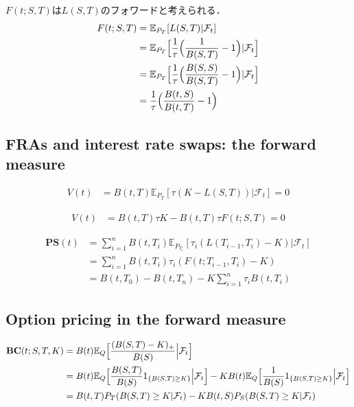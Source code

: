 \documentclass[11pt, a4paper]{jsarticle}
\newcommand{\E}{\mathbb{E}}
\newcommand{\PS}{\textbf{PS}}
\newcommand{\BC}{\textbf{BC}}
\begin{document}
$F(t; S, T)$は$L(S, T)$のフォワードと考えられる．
\begin{align}
F(t; S, T)
& =
\E_{P_T} [ L(S, T) | \mathcal{F}_t ] \nonumber \\
& =
\E_{P_T} \Bigl[ \frac{1}{\tau} \Bigl( \frac{1}{B(S, T)} - 1 \Bigr) | \mathcal{F}_t \Bigr] \nonumber \\
& =
\E_{P_T} \Bigl[ \frac{1}{\tau} \Bigl( \frac{B(S, S)}{B(S, T)} - 1 \Bigr) | \mathcal{F}_t \Bigr] \nonumber \\
& =
\frac{1}{\tau} \Bigl( \frac{B(t, S)}{B(t, T)} - 1 \Bigr) \nonumber
\end{align}

\subsection{FRAs and interest rate swaps: the forward measure}
\begin{align}
V(t)
& =
B(t, T) \E_{P_T} [ \tau (K - L(S, T)) | \mathcal{F}_t ] = 0 \nonumber
\end{align}

\begin{align}
V(t)
& =
B(t, T) \tau K - B(t, T) \tau F(t; S, T) = 0 \nonumber
\end{align}

\begin{align}
\PS(t)
& =
\sum_{i=1}^n B(t, T_i) \E_{P_{T_i}} [ \tau_i (L(T_{i-1}, T_i) - K) | \mathcal{F}_t ] \nonumber \\
& =
\sum_{i=1}^n B(t, T_i) \tau_i (F(t; T_{i-1}, T_i) - K) \nonumber \\
& =
B(t, T_0) - B(t, T_n) - K \sum_{i=1}^n \tau_i B(t, T_i) \nonumber
\end{align}

\subsection{Option pricing in the forward measure}
\begin{align}
\BC(t; S, T, K)
& =
B(t) \E_Q \Bigl[ \frac{(B(S, T) - K)_+}{B(S)} \Bigl| \mathcal{F}_t \Bigr] \nonumber \\
& =
B(t) \E_Q \Bigl[ \frac{B(S, T)}{B(S)} 1_{\{ B(S, T) \geq K \}} \Bigl| \mathcal{F}_t \Bigr]
- K B(t) \E_Q \Bigl[ \frac{1}{B(S)} 1_{\{ B(S, T) \geq K \}} \Bigl| \mathcal{F}_t \Bigr] \nonumber \\
& =
B(t, T) P_T (B(S, T) \geq K | \mathcal{F}_t) - K B(t, S) P_S (B(S, T) \geq K | \mathcal{F}_t) \nonumber
\end{align}
\end{document}
